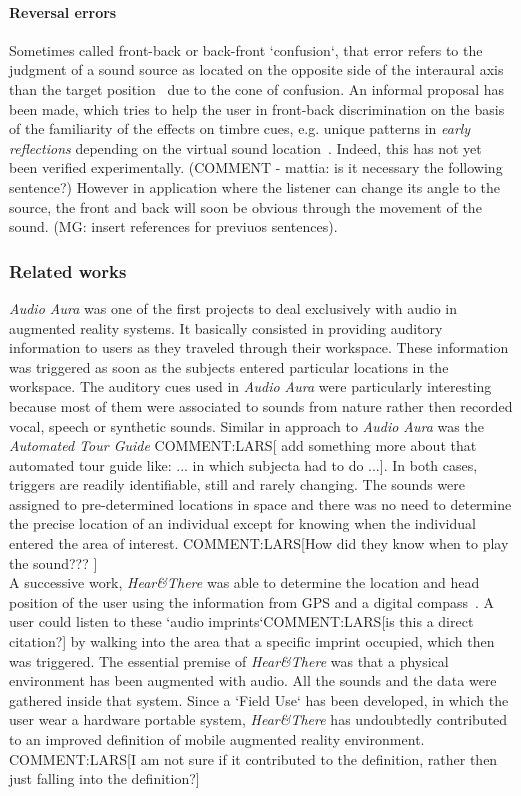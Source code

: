 \documentclass[journal]{IEEEtran}
\begin{document}
\paragraph{Reversal errors}
Sometimes called front-back or back-front `confusion`, that error refers to the judgment of a sound source as located on the opposite side of the interaural axis than the target position~\cite{begault2001} due to the cone of confusion. An informal proposal has been made, which tries to help the user in front-back discrimination on the basis of the familiarity of the effects on timbre cues, e.g. unique patterns in \emph{early reflections} depending on the virtual sound location~\cite{begault1992}. Indeed, this has not yet been verified experimentally. (COMMENT - mattia: is it necessary the following sentence?) However in application where the listener can change its angle to the source, the front and back will soon be obvious through the movement of the sound. (MG: insert references for previuos sentences).\\

\subsubsection{Related works}
\emph{Audio Aura} \cite{mynatt1997} was one of the first projects to deal exclusively with audio in augmented reality systems. It basically consisted in providing auditory information to users as they traveled through their workspace. These information was triggered as soon as the subjects entered particular locations in the workspace. The auditory cues used in \emph{Audio Aura} were particularly interesting because most of them were associated to sounds from nature rather then recorded vocal, speech or synthetic sounds. Similar in approach to \emph{Audio Aura} was the \emph{Automated Tour Guide} \cite{bederson1995} COMMENT:LARS[ add something more about that automated tour guide like: ... in which subjecta had to do ...]. In both cases, triggers are readily identifiable, still and rarely changing. The sounds were assigned to pre-determined locations in space and there was no need to determine the precise location of an individual except for knowing when the individual entered the area of interest. COMMENT:LARS[How did they know when to play the sound??? ]\\

A successive work, \emph{Hear\&There} was able to determine the location and head position of the user using the information from GPS and a digital compass~\cite{rozier2000}. A user could listen to these `audio imprints`COMMENT:LARS[is this a direct citation?] by walking into the area that a specific imprint occupied, which then was triggered. The essential premise of  \emph{Hear\&There} was that a physical environment has been augmented with audio. All the sounds and the data were gathered inside that system. Since a `Field Use` has been developed, in which the user wear a hardware portable system, \emph{Hear\&There} has undoubtedly contributed to an improved definition of mobile augmented reality environment. COMMENT:LARS[I am not sure if it contributed to the definition, rather then just falling into the definition?]\\
\end{document}
